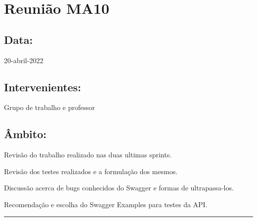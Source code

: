 \section{Reunião MA10}\label{reuniaoMA10}

\subsection*{Data:}
20-abril-2022

\subsection*{Intervenientes:}
Grupo de trabalho e professor

\subsection*{Âmbito:}
Revisão do trabalho realizado nas duas ultimas sprints. 

Revisão dos testes realizados e a formulação dos mesmos. 

Discussão acerca de bugs conhecidos do Swagger e formas de ultrapassa-los. 

Recomendação e escolha do Swagger Examples para testes da API.

\noindent \rule{\linewidth}{0.4pt}
\newline